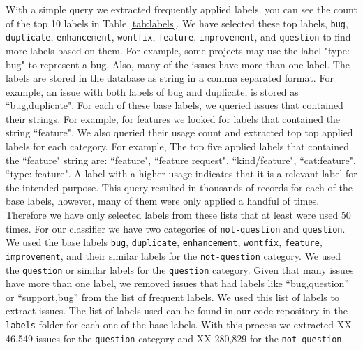 \documentclass[conference]{IEEEtran}
\begin{document}
With a simple query we extracted frequently applied labels. you 
can see the count of the top 10 labels in Table \ref{tab:labels}. 
We have selected these top labels, \verb|bug|, \verb|duplicate|, \verb|enhancement|, \verb|wontfix|,
\verb|feature|, \verb|improvement|, and \verb|question| to find more labels based on them.
For example, some projects may use the label "type: bug" to represent a bug. Also, many of the issues 
have more than one label. The labels are stored in the database as string in a comma separated format. 
For example, an issue with both labels of bug and duplicate, is stored as ``bug,duplicate". 
For each of these base labels, we queried issues that contained their strings. For example,
for features we looked for labels that contained the string ``feature". We also queried their usage count and
extracted top top applied labels for each category.
For example, The top five applied labels that contained the ``feature" string 
are: ``feature", ``feature request", ``kind/feature", ``cat:feature", ``type: feature".
A label with a higher usage indicates that it is a relevant label for the intended purpose. This query resulted
in thousands of records for each of the base labels, however, many of them were only applied
a handful of times. Therefore we have only selected labels from these lists that 
at least were used 50 times. For our classifier we have two categories of \verb|not-question| 
and \verb|question|. We used the base labels \verb|bug|, \verb|duplicate|, \verb|enhancement|, \verb|wontfix|,
\verb|feature|, \verb|improvement|, and their similar labels for the \verb|not-question| category. We used
the \verb|question| or similar labels for the \verb|question| category. Given that many issues have 
more than one label, we removed issues that had labels like ``bug,question'' or ``support,bug'' from 
the list of frequent labels. We used this list of labels to extract issues. The list of labels
used can be found in our code repository in the \verb|labels| folder for each one of the base labels.
With this process we extracted XX 46,549 issues for the \verb|question| category and XX 280,829 for 
the \verb|not-question|.
\end{document}
